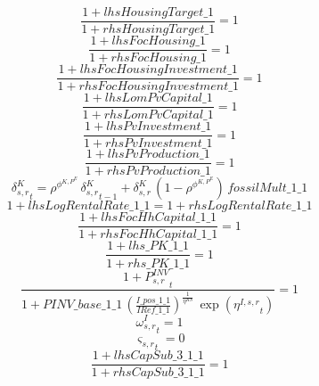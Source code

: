 \begin{dmath}
\frac{1+{lhsHousingTarget\_1}}{1+{rhsHousingTarget\_1}}=1
\end{dmath}
\begin{dmath}
\frac{1+{lhsFocHousing\_1}}{1+{rhsFocHousing\_1}}=1
\end{dmath}
\begin{dmath}
\frac{1+{lhsFocHousingInvestment\_1}}{1+{rhsFocHousingInvestment\_1}}=1
\end{dmath}
\begin{dmath}
\frac{1+{lhsLomPvCapital\_1}}{1+{rhsLomPvCapital\_1}}=1
\end{dmath}
\begin{dmath}
\frac{1+{lhsPvInvestment\_1}}{1+{rhsPvInvestment\_1}}=1
\end{dmath}
\begin{dmath}
\frac{1+{lhsPvProduction\_1}}{1+{rhsPvProduction\_1}}=1
\end{dmath}
\begin{dmath}
{{\delta^{K}_{s,r}}}_{t}={{\rho^{\phi^{K,P^E}}}}\, {{\delta^{K}_{s,r}}}_{t-1}+{{\delta^{K}_{s,r}}}\, \left(1-{{\rho^{\phi^{K,P^E}}}}\right)\, {fossilMult\_1\_1}
\end{dmath}
\begin{dmath}
1+{lhsLogRentalRate\_1\_1}=1+{rhsLogRentalRate\_1\_1}
\end{dmath}
\begin{dmath}
\frac{1+{lhsFocHhCapital\_1\_1}}{1+{rhsFocHhCapital\_1\_1}}=1
\end{dmath}
\begin{dmath}
\frac{1+{lhs\_PK\_1\_1}}{1+{rhs\_PK\_1\_1}}=1
\end{dmath}
\begin{dmath}
\frac{1+{{P^{INV}_{s,r}}}_{t}}{1+{PINV\_base\_1\_1}\, \left(\frac{{I\_pos\_1\_1}}{{IRef\_1\_1}}\right)^{\frac{1}{{{\eta^{KS}}}}}\, \exp\left({{\eta^{I,s,r}}}_{t}\right)}=1
\end{dmath}
\begin{dmath}
{{\omega^I_{s,r}}}_{t}=1
\end{dmath}
\begin{dmath}
{{\varsigma_{s,r}}}_{t}=0
\end{dmath}
\begin{dmath}
\frac{1+{lhsCapSub\_3\_1\_1}}{1+{rhsCapSub\_3\_1\_1}}=1
\end{dmath}
